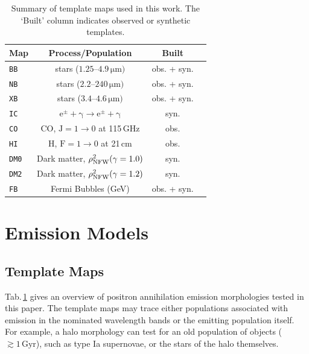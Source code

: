 \documentclass[doublespace,nopageskip]{VTthesis} %
\begin{document}
	
	\begin{table}
		\centering
		\caption{Summary of template maps used in this work. The `Built' column indicates observed or synthetic templates.}
		\begin{tabular}{lccc}
			\hline
			\hline
			Map & Process/Population                                  & Built               \\
			\hline
			\texttt{BB}  & stars ($1.25$--$4.9\,\mathrm{\mu m})$     & obs. + syn.        \\
			\texttt{NB}  & stars  ($2.2$--$240\,\mathrm{\mu m})$     & obs. + syn. \\
			\texttt{XB}  & stars ($3.4$--$4.6\,\mathrm{\mu m})$     & obs. + syn. \\ 
			\texttt{IC}  & $\mathrm{e^{\pm}+\gamma \rightarrow e^{\pm}+\gamma}$ & syn.        \\
			\texttt{CO}  & CO, $\mathrm{J=1 \rightarrow 0}$ at 115\,GHz            & obs.        \\
			\texttt{HI}  & H, $\mathrm{F=1 \rightarrow 0}$ at 21\,cm               & obs.        \\
			\texttt{DM0} & Dark matter, $\rho_{\rm NFW}^2(\gamma=1.0)$             & syn.        \\
			\texttt{DM2} & Dark matter, $\rho_{\rm NFW}^2(\gamma=1.2)$             & syn.        \\
			\texttt{FB}  & Fermi Bubbles (GeV)                                 & obs. + syn. \\
			\hline
			\hline
		\end{tabular}
		\label{tab:maps}
	\end{table}
	
	
	\section{Emission Models}\label{sec:emission_models}
	\subsection{Template Maps}\label{sec:3D_models}
	Tab.\,\ref{tab:maps} gives an overview of positron annihilation emission morphologies tested in this paper.
	The template maps may trace either populations associated with emission in the nominated wavelength bands or the emitting population itself.
	For example, a halo morphology can test for an old population of objects ($\gtrsim 1\,\mathrm{Gyr}$), such as type Ia supernovae, or the stars of the halo themselves.
	
\end{document}
